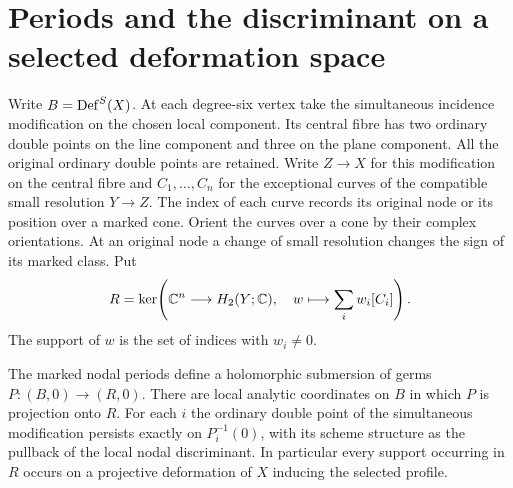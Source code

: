 \section{Periods and the discriminant on a selected deformation space}
\label{sec:marked-periods}

Write $B=\operatorname{Def}^S(X)$. At each degree-six vertex take the simultaneous
incidence modification on the chosen local component. Its central fibre
has two ordinary double points on the line component and three on the
plane component. All the original ordinary double points are retained.
Write $Z\to X$ for this modification on the central fibre and
$C_1,\ldots,C_n$ for the exceptional curves of the compatible small
resolution $Y\to Z$. The index of each curve records its original node
or its position over a marked cone. Orient the curves over a cone by
their complex orientations. At an original node a change of small
resolution changes the sign of its marked class. Put
\[
 R=\ker\!\left(\mathbb C^n\longrightarrow H_2(Y;\mathbb C),\quad
                         w\longmapsto\sum_iw_i[C_i]\right).
\]
The support of $w$ is the set of indices with $w_i\ne0$.

\begin{theorem}\label{thm:marked-periods}
The marked nodal periods define a holomorphic submersion of germs
$P\colon(B,0)\to(R,0)$. There are local analytic coordinates on $B$
in which $P$ is projection onto $R$. For each $i$ the ordinary double
point of the simultaneous modification persists exactly on
$P_i^{-1}(0)$, with its scheme structure as the pullback of the local
nodal discriminant. In particular every support occurring in $R$ occurs
on a projective deformation of $X$ inducing the selected profile.
\end{theorem}

